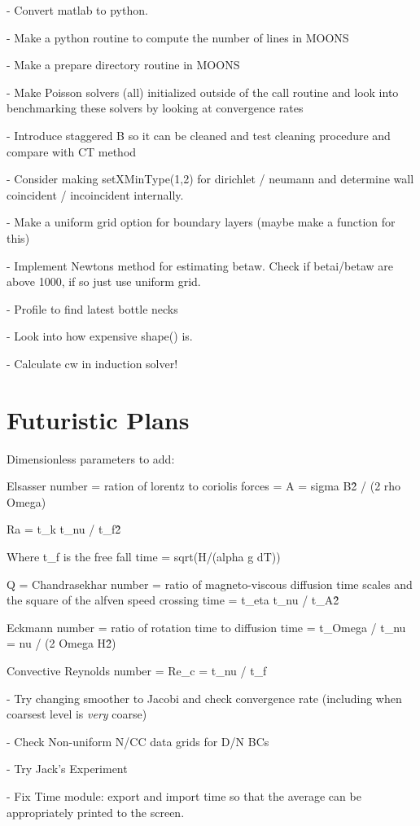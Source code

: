 \documentclass[11pt]{article}
\begin{document}
- Convert matlab to python.

- Make a python routine to compute the number of lines in MOONS

- Make a prepare directory routine in MOONS

- Make Poisson solvers (all) initialized outside of the call routine and look into benchmarking these solvers by looking at convergence rates

- Introduce staggered B so it can be cleaned and test cleaning procedure and compare with CT method

- Consider making setXMinType(1,2) for dirichlet / neumann and determine wall coincident / incoincident internally.

- Make a uniform grid option for boundary layers (maybe make a function for this)

- Implement Newtons method for estimating betaw. Check if betai/betaw
are above 1000, if so just use uniform grid.

- Profile to find latest bottle necks

- Look into how expensive shape() is.

- Calculate cw in induction solver!

\section{Futuristic Plans}

Dimensionless parameters to add:

Elsasser number = ration of lorentz to coriolis forces = A = sigma B\^2 / (2 rho Omega)

Ra = t\_k t\_nu / t\_f\^2

Where t\_f is the free fall time = sqrt(H/(alpha g dT))

Q = Chandrasekhar number = ratio of magneto-viscous diffusion time scales and the square of the alfven speed crossing time
 = t\_eta t\_nu / t\_A\^2

Eckmann number = ratio of rotation time to diffusion time
 = t\_Omega / t\_nu = nu / (2 Omega H\^2)


Convective Reynolds number = Re\_c = t\_nu / t\_f

- Try changing smoother to Jacobi and check convergence rate (including when coarsest level is \textit{very} coarse)

- Check Non-uniform N/CC data grids for D/N BCs

- Try Jack's Experiment

- Fix Time module: export and import time so that the average can be appropriately
printed to the screen.
\end{document}
